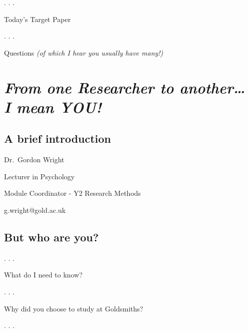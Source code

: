 \documentclass[
  letterpaper,
  DIV=11,
  numbers=noendperiod]{scrartcl}
\begin{document}
. . .

\begin{tcolorbox}[enhanced jigsaw, bottomrule=.15mm, arc=.35mm, opacityback=0, colframe=quarto-callout-tip-color-frame, breakable, colback=white, toprule=.15mm, rightrule=.15mm, left=2mm, leftrule=.75mm]

Today's Target Paper

\end{tcolorbox}

. . .

\begin{tcolorbox}[enhanced jigsaw, bottomrule=.15mm, arc=.35mm, opacityback=0, colframe=quarto-callout-caution-color-frame, breakable, colback=white, toprule=.15mm, rightrule=.15mm, left=2mm, leftrule=.75mm]

Questions \emph{(of which I hear you usually have many!)}

\end{tcolorbox}

\hypertarget{from-one-researcher-to-another-i-mean-you}{%
\section{\texorpdfstring{\emph{From one Researcher to another\ldots{} I
mean
YOU!}}{From one Researcher to another\ldots{} I mean YOU!}}\label{from-one-researcher-to-another-i-mean-you}}

\hypertarget{a-brief-introduction}{%
\subsection{A brief introduction}\label{a-brief-introduction}}

Dr.~Gordon Wright

Lecturer in Psychology

Module Coordinator - Y2 Research Methods

g.wright@gold.ac.uk

\hypertarget{but-who-are-you}{%
\subsection{But who are you?}\label{but-who-are-you}}

. . .

\hfill\break
What do I need to know?

. . .

\hfill\break
Why did you choose to study at Goldsmiths?

. . .
\end{document}

